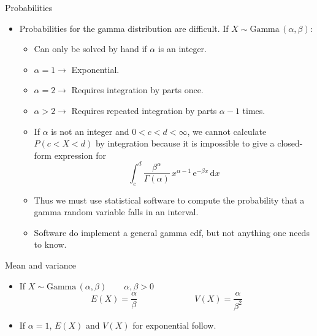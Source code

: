 \documentclass{article}
\newcommand{\follow}[1]{\sim \text{#1}\,}		%
\newcommand{\integral}[4]{\displaystyle \int_{#1}^{#2} #3 \,\mathrm{d} #4}		%
\newcommand{\e}{\mathrm{e}}		%
\newcommand{\gam}[1]{\Gamma(#1)}		%
\begin{document}
Probabilities\bigskip
\begin{itemize}
    \item Probabilities for the gamma distribution are difficult. If $X \follow{Gamma}(\alpha, \beta)$:
    \begin{itemize}
        \item Can only be solved by hand if $\alpha$ is an integer.
        \item[] $\alpha = 1 \rightarrow$ Exponential.
        \item[] $\alpha = 2 \rightarrow$ Requires integration by parts once.
        \item[] $\alpha > 2 \rightarrow$ Requires repeated integration by parts $\alpha - 1$ times.
        \item If $\alpha$ is not an integer and $0 < c < d < \infty$, we cannot calculate $P(c < X < d)$ by integration because it is impossible to give a closed-form expression for
        \[\integral{c}{d}{\frac{\beta^\alpha}{\gam{\alpha}} \, x^{\alpha - 1} \, \e^{-\beta x}}{x}\]
        \item[] Thus we must use statistical software to compute the probability that a gamma random variable falls in an interval.
        \item Software do implement a general gamma cdf, but not anything one needs to know.
    \end{itemize}
\end{itemize}\bigskip

Mean and variance\bigskip
\begin{itemize}
    \item If $X \follow{Gamma}(\alpha, \beta) \quad\quad \alpha, \beta > 0$\smallskip
    \[E(X) = \frac{\alpha}{\beta} \hspace{80pt} V(X) = \frac{\alpha}{\beta^2}\]
    \item If $\alpha = 1$, $E(X)$ and $V(X)$ for exponential follow.
\end{itemize}

\newpage
\end{document}
